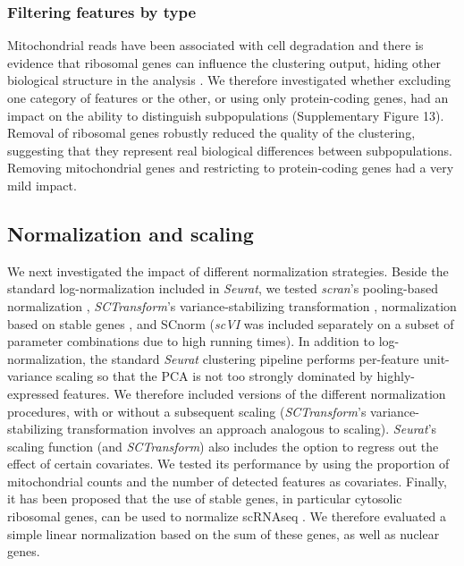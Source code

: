 \documentclass{bmcart}
\begin{document}
\subsubsection*{Filtering features by type}

Mitochondrial reads have been associated with cell degradation and there is evidence that ribosomal genes can influence the clustering output, hiding other biological structure in the analysis \cite{freytagComparison2018}. We therefore investigated whether excluding one category of features or the other, or using only protein-coding genes, had an impact on the ability to distinguish subpopulations (Supplementary Figure 13). Removal of ribosomal genes robustly reduced the quality of the clustering, suggesting that they represent real biological differences between subpopulations. Removing mitochondrial genes and restricting to protein-coding genes had a very mild impact.

\subsection*{Normalization and scaling}

We next investigated the impact of different normalization strategies. Beside the standard log-normalization included in \textit{Seurat}, we tested \textit{scran}'s pooling-based normalization \cite{lunPooling2016}, \textit{SCTransform}'s variance-stabilizing transformation \cite{hafemeisterSCtransform2019}, normalization based on stable genes \cite{linStableGenes2018, deekeStablyExpressed2018}, and SCnorm \cite{bacherSCnorm2017} (\textit{scVI} \cite{lopezDeep2018} was included separately on a subset of parameter combinations due to high running times). In addition to log-normalization, the standard \textit{Seurat} clustering pipeline performs per-feature unit-variance scaling so that the PCA is not too strongly dominated by highly-expressed features. We therefore included versions of the different normalization procedures, with or without a subsequent scaling (\textit{SCTransform}'s variance-stabilizing transformation involves an approach analogous to scaling). 
\textit{Seurat}'s scaling function (and \textit{SCTransform}) also includes the option to regress out the effect of certain covariates. We tested its performance by using the proportion of mitochondrial counts and the number of detected features as covariates. Finally, it has been proposed that the use of stable genes, in particular cytosolic ribosomal genes, can be used to normalize scRNAseq \cite{deekeStablyExpressed2018}. We therefore evaluated a simple linear normalization based on the sum of these genes, as well as nuclear genes.
\end{document}
